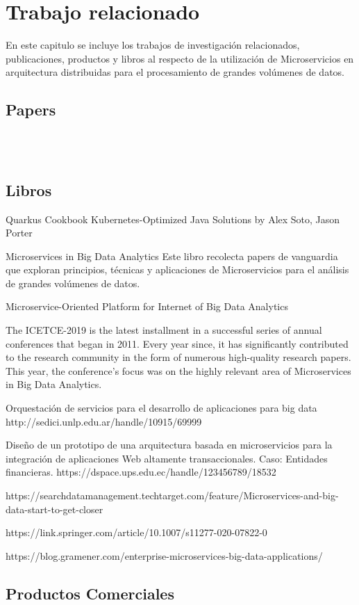 \chapter{Trabajo relacionado}

En este capitulo se incluye los trabajos de investigación relacionados, publicaciones, productos y libros al respecto de la utilización de Microservicios en arquitectura distribuidas para el procesamiento de grandes volúmenes de datos.


\section{Papers}


\\

\\
 

\section{Libros}

Quarkus Cookbook Kubernetes-Optimized Java Solutions by Alex Soto, Jason Porter

\par


Microservices in Big Data Analytics
\cite{MicroservicesInBigDataAnalytics}
Este libro recolecta papers de vanguardia que exploran principios, técnicas y aplicaciones de Microservicios para el análisis de grandes volúmenes de datos.
\par

Microservice-Oriented Platform for Internet of Big Data Analytics
\cite{3084568720190306}

\par




The ICETCE-2019 is the latest installment in a successful series of annual conferences that began in 2011. Every year since, it has significantly contributed to the research community in the form of numerous high-quality research papers. This year, the conference’s focus was on the highly relevant area of Microservices in Big Data Analytics.


Orquestación de servicios para el desarrollo de aplicaciones para big data
http://sedici.unlp.edu.ar/handle/10915/69999


Diseño de un prototipo de una arquitectura basada en microservicios para la integración de aplicaciones Web altamente transaccionales. Caso: Entidades financieras.
https://dspace.ups.edu.ec/handle/123456789/18532

https://searchdatamanagement.techtarget.com/feature/Microservices-and-big-data-start-to-get-closer

https://link.springer.com/article/10.1007/s11277-020-07822-0

https://blog.gramener.com/enterprise-microservices-big-data-applications/

\section{Productos Comerciales}